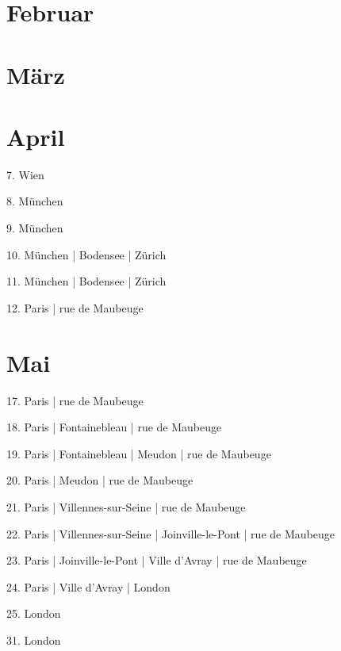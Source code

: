 \documentclass[twoside=false,titlepage=false,open=any, parskip=never, fontsize=10pt, headings=small, chapterprefix=false, appendixprefix=false, DIV=15]{scrbook}
\begin{document}
\begin{multicols}{3}
            \section*{Februar}
            \section*{März}
            \section*{April}
            7. Wien\par
            8. München\par
            9. München\par
            10. München | Bodensee | Zürich\par
            11. München | Bodensee | Zürich\par
            12. Paris | rue de Maubeuge\par
            \section*{Mai}
            17. Paris | rue de Maubeuge\par
            18. Paris | Fontainebleau | rue de Maubeuge\par
            19. Paris | Fontainebleau | Meudon | rue de Maubeuge\par
            20. Paris | Meudon | rue de Maubeuge\par
            21. Paris | Villennes-sur-Seine | rue de Maubeuge\par
            22. Paris | Villennes-sur-Seine | Joinville-le-Pont | rue de Maubeuge\par
            23. Paris | Joinville-le-Pont | Ville d'Avray | rue de Maubeuge\par
            24. Paris | Ville d'Avray | London\par
            25. London\par
            31. London\par

\end{multicols}
\end{document}

